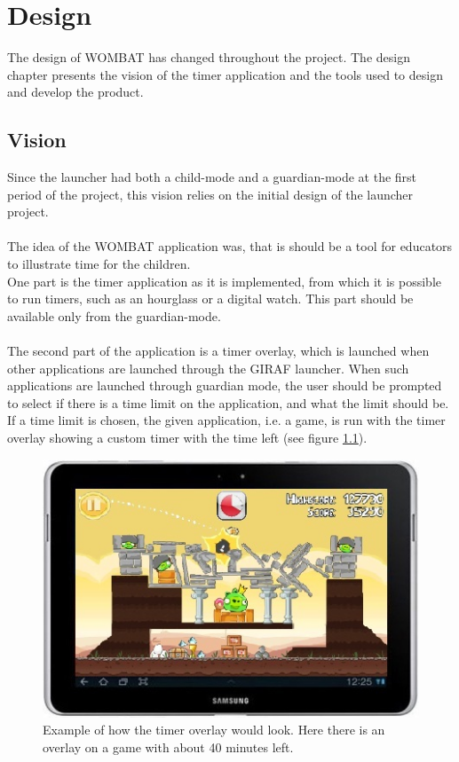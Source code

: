 \chapter{Design}
\label{cha:design}
The design of WOMBAT has changed throughout the project. The design chapter presents the vision of the timer application and the tools used to design and develop the product. %

\section{Vision}
\label{sec:vision}
Since the launcher had both a child-mode and a guardian-mode at the first period of the project, this vision relies on the initial design of the launcher project.\\ \\
	The idea of the WOMBAT application was, that is should be a tool for educators to illustrate time for the children.\\
	
One part is the timer application as it is implemented, from which it is possible to run timers, such as an hourglass or a digital watch. This part should be available only from the guardian-mode.\\ \\
  The second part of the application is a timer overlay, which is launched when other applications are launched through the GIRAF launcher. When such applications are launched through guardian mode, the user should be prompted to select if there is a time limit on the application, and what the limit should be. If a time limit is chosen, the given application, i.e. a game, is run with the timer overlay showing a custom timer with the time left (see figure \ref{fig:init_overlay_drawings}).
	
	\begin{figure}[H]
		\centering
			\includegraphics[width=\textwidth]{Images/paper_prototype/overlay.png}
				\caption{Example of how the timer overlay would look. Here there is an overlay on a game with about 40 minutes left.}
		\label{fig:init_overlay_drawings}
	\end{figure}
	
